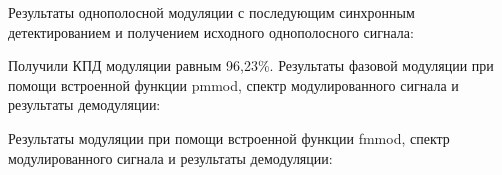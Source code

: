 \documentclass[12pt,a4paper]{report}
\begin{document}
\begin{figure}[h!]
\end{figure}

Результаты однополосной модуляции с последующим синхронным детектированием и получением исходного однополосного сигнала:

\begin{figure}[h]
\end{figure}

Получили КПД модуляции равным 96,23\%.
\newpage
Результаты фазовой модуляции при помощи встроенной функции pmmod, спектр модулированного сигнала и результаты демодуляции:

\begin{figure}[h!]
\end{figure}

Результаты модуляции при помощи встроенной функции fmmod, спектр модулированного сигнала и результаты демодуляции:
\end{document}
